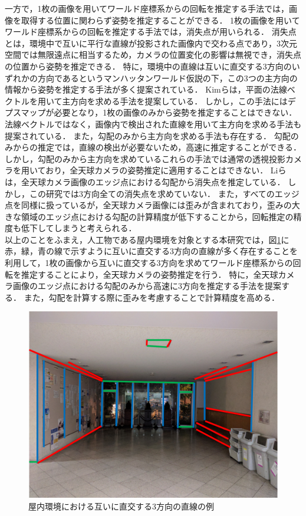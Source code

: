 一方で，1枚の画像を用いてワールド座標系からの回転を推定する手法では，画像を取得する位置に関わらず姿勢を推定することができる．
1枚の画像を用いてワールド座標系からの回転を推定する手法では，消失点が用いられる．
消失点とは，環境中で互いに平行な直線が投影された画像内で交わる点であり，3次元空間では無限遠点に相当するため，カメラの位置変化の影響は無視でき，消失点の位置から姿勢を推定できる．
特に，環境中の直線は互いに直交する3方向のいずれかの方向であるというマンハッタンワールド仮説\mbox{\cite{Coughlan2001}}の下，この3つの主方向の情報から姿勢を推定する手法が多く提案されている．
Kimらは，平面の法線ベクトルを用いて主方向を求める手法を提案している\mbox{\cite{Kim2017}}．
しかし，この手法にはデプスマップが必要となり，1枚の画像のみから姿勢を推定することはできない．
法線ベクトルではなく，画像内で検出された直線を用いて主方向を求める手法も提案されている\mbox{\cite{Bazin2012a}}\mbox{\cite{Elloumi2012}}\mbox{\cite{Elloumi2013}}\mbox{\cite{Lee2015}}．
また，勾配のみから主方向を求める手法も存在する\mbox{\cite{Antone2000}}\mbox{\cite{Martins2005}}\mbox{\cite{Denis2008}}．
勾配のみからの推定では，直線の検出が必要ないため，高速に推定することができる．
しかし，勾配のみから主方向を求めているこれらの手法では通常の透視投影カメラを用いており，全天球カメラの姿勢推定に適用することはできない．
Liらは，全天球カメラ画像のエッジ点における勾配から消失点を推定している\mbox{\cite{Li2012}}．
しかし，この研究では3方向全ての消失点を求めていない．
また，すべてのエッジ点を同様に扱っているが，全天球カメラ画像には歪みが含まれており，歪みの大きな領域のエッジ点における勾配の計算精度が低下することから，回転推定の精度も低下してしまうと考えられる．
\\

以上のことをふまえ，人工物である屋内環境を対象とする本研究では，図\ref{fig:manhattan}に赤，緑，青の線で示すように互いに直交する3方向の直線が多く存在することを利用して，1枚の画像から互いに直交する3方向を求めてワールド座標系からの回転を推定することにより，全天球カメラの姿勢推定を行う．
特に，全天球カメラ画像のエッジ点における勾配のみから高速に3方向を推定する手法を提案する．
また，勾配を計算する際に歪みを考慮することで計算精度を高める．

\begin{figure}[b]
 \begin{center}
 \includegraphics[width=0.7\columnwidth]{./chap2/fig/manhattan.png}
 \caption{屋内環境における互いに直交する3方向の直線の例}
 \label{fig:manhattan}
 \end{center}
\end{figure}

